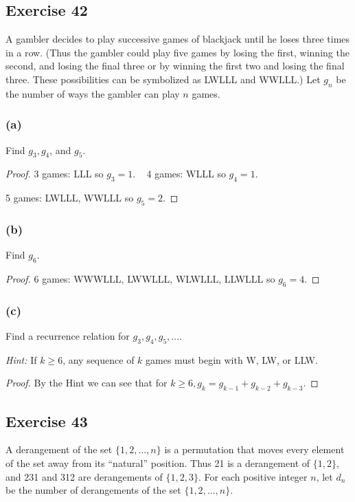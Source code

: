 \documentclass[14pt]{extarticle}
\begin{document}
\subsection{Exercise 42}
A gambler decides to play successive games of blackjack until he loses three times in a row. (Thus the gambler
could play five games by losing the first, winning the second, and losing the final three or by winning the first
two and losing the final three. These possibilities can be symbolized as LWLLL and WWLLL.) Let \(g_n\) be the number
of ways the gambler can play $n$ games.

\subsubsection{(a)}
Find \(g_3, g_4\), and \(g_5\).

\begin{proof}
     3 games: LLL so \(g_3 = 1\). \,\,\, 4 games: WLLL so \(g_4 = 1\).

     5 games: LWLLL, WWLLL so \(g_5 = 2\).
\end{proof}

\subsubsection{(b)}
Find \(g_6\).

\begin{proof}
     6 games: WWWLLL, LWWLLL, WLWLLL, LLWLLL so \(g_6 = 4\).
\end{proof}

\subsubsection{(c)}
Find a recurrence relation for \(g_3, g_4, g_5, \ldots\).

     {\it Hint:} If \(k \geq 6\), any sequence of $k$ games must begin with W, LW, or LLW.

\begin{proof}
     By the Hint we can see that for \(k \geq 6, g_k = g_{k-1} + g_{k-2} + g_{k-3}\).
\end{proof}

\subsection{Exercise 43}
A derangement of the set \(\{1, 2, \ldots, n\}\) is a permutation that moves every element of the set away from
its “natural” position. Thus 21 is a derangement of \(\{1, 2\}\), and 231 and 312 are derangements of \(\{1, 2, 3\}\).
For each positive integer $n$, let \(d_n\) be the number of derangements of the set \(\{1, 2, \ldots, n\}\).
\end{document}
